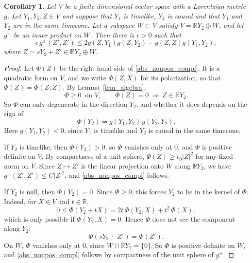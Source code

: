 \documentclass[12pt,reqno]{amsart}
\numberwithin{equation}{section}
\theoremstyle{definition}
\theoremstyle{plain}
\newtheorem{corollary}[theorem]{Corollary}
\theoremstyle{definition}
\theoremstyle{definition}
\newcommand{\R}{\mathbb{R}}
\def\R{\mathbb R}
\begin{document}
\begin{corollary}\label{cor_algebra}
Let $V$ be a finite dimensional vector space with a Lorentzian metric $g$.
Let $Y_1, Y_2, Z \in V$ and suppose that $Y_1$ is timelike, $Y_2$ is causal and that $Y_1$ and $Y_2$ are in the same timecone.
Let a subspace $W \subset V$ satisfy $V = \R Y_2 \oplus W$, and let $g^+$ be an inner product on $W$.
Then there is $\epsilon > 0$ such that
\begin{equation}\label{abs_nonpos_compl}
\epsilon\, g^+(Z', Z') \le 2 g(Z, Y_1) g(Z, Y_2) - g(Z, Z) g(Y_1, Y_2),
\end{equation}
where $Z = sY_2 + Z' \in \R Y_2 \oplus W$.
\end{corollary}

\begin{proof}
Let $\Phi(Z)$ be the right-hand side of \eqref{abs_nonpos_compl}. It is a quadratic form on $V$, and we write $\Phi(Z,X)$ for its polarization, so that $\Phi(Z)=\Phi(Z,Z)$. By Lemma~\ref{lem_algebra},
\[
\Phi\ge0\ \text{ on }V,\qquad \Phi(Z)=0\ \Longrightarrow\ Z\in\R Y_2 .
\]
So $\Phi$ can only degenerate in the direction $Y_2$, and whether it does depends on the sign of
\[
\Phi(Y_2)=g(Y_1,Y_2)\,g(Y_2,Y_2).
\]
Here $g(Y_1,Y_2)<0$, since $Y_1$ is timelike and $Y_2$ is causal in the same timecone.

If $Y_2$ is timelike, then $\Phi(Y_2)>0$, so $\Phi$ vanishes only at $0$, and $\Phi$ is positive definite on $V$. By compactness of a unit sphere, $\Phi(Z)\ge\epsilon_0|Z|^2$ for any fixed norm on $V$. Since $Z\mapsto Z'$ is the linear projection onto $W$ along $\R Y_2$, we have $g^+(Z',Z')\le C|Z|^2$, and \eqref{abs_nonpos_compl} follows.

If $Y_2$ is null, then $\Phi(Y_2)=0$. Since $\Phi\ge0$, this forces $Y_2$ to lie in the kernel of $\Phi$. Indeed, for $X\in V$ and $t\in\R$,
\[
0\le\Phi(Y_2+tX)=2t\,\Phi(Y_2,X)+t^2\,\Phi(X),
\]
which is only possible if $\Phi(Y_2,X)=0$. Hence $\Phi$ does not see the component along $Y_2$:
\[
\Phi(sY_2+Z')=\Phi(Z').
\]
On $W$, $\Phi$ vanishes only at $0$, since $W\cap\R Y_2=\{0\}$. So $\Phi$ is positive definite on $W$, and \eqref{abs_nonpos_compl} follows by compactness of the unit sphere of $g^+$.
\end{proof}
\end{document}
